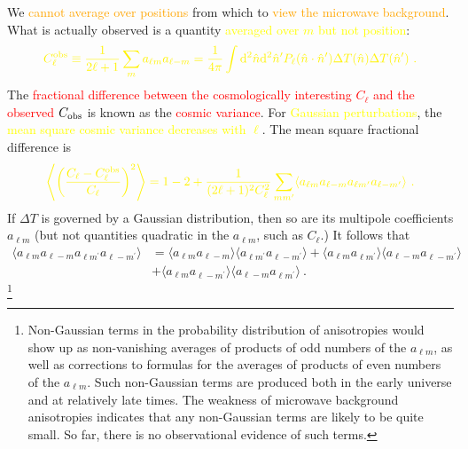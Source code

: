 \documentclass[12pt,a4paper]{article}
\newcommand{\dif}{\mathrm{d}}
\begin{document}
We \textcolor{orange}{cannot average over positions} from which to \textcolor{orange}{view the microwave background}. What is actually observed is a quantity \textcolor{yellow}{averaged over $m$ but not position}:
\begin{equation}
\color{yellow} C_\ell^{\rm obs} \equiv \dfrac{1}{2\ell +1} \sum_m a_{\ell m} a_{\ell -m} = \dfrac{1}{4\pi} \int \dif^2 \hat{n} \dif^2 \hat{n}^\prime P_\ell(\hat{n} \cdot \hat{n}^\prime) \Delta T(\hat{n})\Delta T(\hat{n}^\prime) ~.
\end{equation}
The \textcolor{red}{fractional difference between the cosmologically interesting $C_\ell$ and the observed $C_{\rm obs}$} is known as the \textcolor{red}{cosmic variance}. For \textcolor{yellow}{Gaussian perturbations}, the \textcolor{yellow}{mean square cosmic variance decreases with $\ell$}. The mean square fractional difference is
\begin{equation}
\color{yellow} \left\langle \left(\dfrac{C_\ell - C_\ell^{\rm obs}}{C_\ell} \right)^2 \right\rangle = 1 -2 +\dfrac{1}{(2\ell +1)^2 C_\ell^2} \sum_{m m^\prime} \langle a_{\ell m} a_{\ell -m} a_{\ell m^\prime} a_{\ell -m^\prime} \rangle ~.
\label{eq:frac_diff}
\end{equation}
If $\Delta T$ is governed by a Gaussian distribution, then so are its multipole coefficients $a_{\ell m}$ (but not quantities quadratic in the $a_{\ell m}$, such as $C_\ell$.) It follows that
\begin{align}
\nonumber \langle a_{\ell m} a_{\ell -m} a_{\ell m^\prime} a_{\ell -m^\prime} \rangle &= \langle a_{\ell m} a_{\ell -m} \rangle \langle a_{\ell m^\prime} a_{\ell -m^\prime} \rangle + \langle a_{\ell m} a_{\ell m^\prime} \rangle \langle a_{\ell -m}  a_{\ell -m^\prime} \rangle \\
&+  \langle a_{\ell m} a_{\ell -m^\prime} \rangle \langle a_{\ell -m}  a_{\ell m^\prime} \rangle ~.
\label{eq:alm4}
\end{align}\footnote{Non-Gaussian terms in the probability distribution of anisotropies would show up as non-vanishing averages of products of odd numbers of the $a_{\ell m}$, as well as corrections to formulas for the averages of products of even numbers of the $a_{\ell m}$. Such non-Gaussian terms are produced both in the early universe and at relatively late times. The weakness of microwave background anisotropies indicates that any non-Gaussian terms are likely to be quite small. So far, there is no observational evidence of such terms.}
\end{document}
